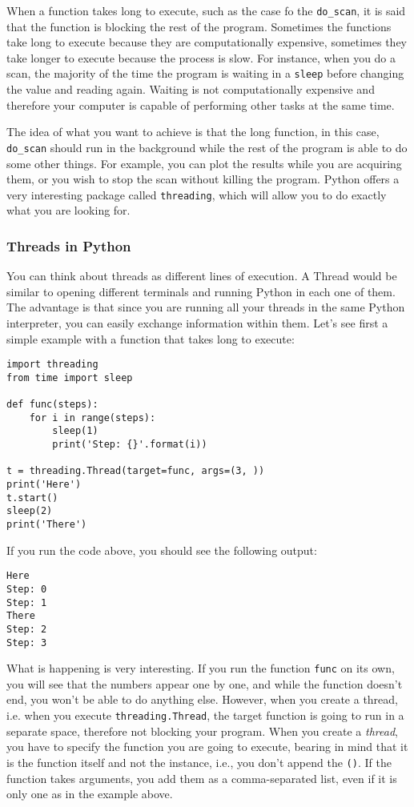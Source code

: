 When a function takes long to execute, such as the case fo the
\texttt{do_scan}, it is said that the function is blocking the rest of
the program. Sometimes the functions take long to execute because they
are computationally expensive, sometimes they take longer to execute
because the process is slow. For instance, when you do a scan, the
majority of the time the program is waiting in a \texttt{sleep} before
changing the value and reading again. Waiting is not computationally
expensive and therefore your computer is capable of performing other
tasks at the same time.

The idea of what you want to achieve is that the long function, in this
case, \texttt{do_scan} should run in the background while the rest of
the program is able to do some other things. For example, you can plot
the results while you are acquiring them, or you wish to stop the scan
without killing the program. Python offers a very interesting package
called \texttt{threading}, which will allow you to do exactly what you
are looking for.

\subsubsection{Threads in Python}\label{threads-inpython}
You can think about threads as different lines of execution. A Thread
would be similar to opening different terminals and running Python in
each one of them. The advantage is that since you are running all your
threads in the same Python interpreter, you can easily exchange
information within them. Let's see first a simple example with a
function that takes long to execute:

\begin{verbatim}
import threading
from time import sleep

def func(steps):
    for i in range(steps):
        sleep(1)
        print('Step: {}'.format(i))

t = threading.Thread(target=func, args=(3, ))
print('Here')
t.start()
sleep(2)
print('There')
\end{verbatim}

If you run the code above, you should see the following output:

\begin{verbatim}
Here
Step: 0
Step: 1
There
Step: 2
Step: 3
\end{verbatim}

What is happening is very interesting. If you run the function
\texttt{func} on its own, you will see that the numbers appear one by
one, and while the function doesn't end, you won't be able to do
anything else. However, when you create a thread, i.e. when you execute
\texttt{threading.Thread}, the target function is going to run in a
separate space, therefore not blocking your program. When you create a
\emph{thread}, you have to specify the function you are going to
execute, bearing in mind that it is the function itself and not the
instance, i.e., you don't append the \texttt{()}. If the function takes
arguments, you add them as a comma-separated list, even if it is only
one as in the example above.

